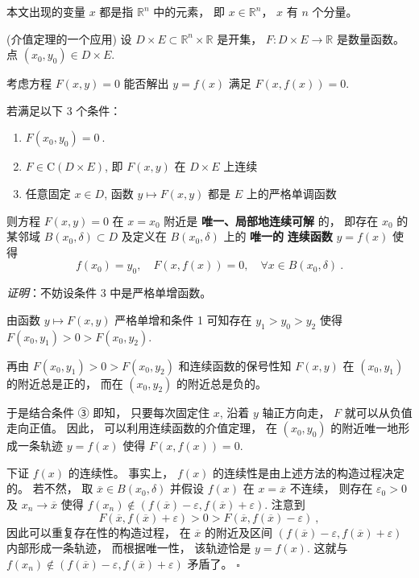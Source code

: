 

本文出现的变量 $x$ 都是指 $\mathbb{R}^n$ 中的元素， 即 $x\in\mathbb{R}^n$， $x$ 有 $n$ 个分量。

\begin{theorem}{(介值定理的一个应用)}\label{the_impli_1}
设 $D\times E\subset\mathbb{R}^{n}\times\mathbb{R}$ 是开集，
$F:D\times E\rightarrow\mathbb{R}$ 是数量函数。 点 $(x_{0},y_{0})\in D\times E.$ 

考虑方程 $F(x,y)=0$ 能否解出 $y=f(x)$ 满足 $F(x,f(x))=0.$ 

若满足以下 3 个条件：

\begin{enumerate}
\item $F(x_{0},y_{0})=0~.$
\item $F\in\mathrm{C}(D\times E)$, 即 $F(x,y)$ 在 $D\times E$ 上连续
\item 任意固定 $x\in D$, 函数 $y\mapsto F(x,y)$ 都是 $E$ 上的严格单调函数
\end{enumerate}

则方程 $F(x,y)=0$ 在 $x=x_{0}$ 附近是\textbf{ 唯一、局部地连续可解} 的， 即存在 $x_{0}$
的某邻域 $B(x_{0},\delta)\subset D$ 及定义在 $B(x_{0},\delta)$ 上的 \textbf{唯一的}\textbf{
连续函数} $y=f(x)$ 使得
$$
f(x_{0})=y_{0},\quad F(x,f(x))=0,\quad\forall x\in B(x_{0},\delta)~.
$$
\end{theorem}

\textsl{证明}：不妨设条件 3 中是严格单增函数。 

由函数 $y\mapsto F(x,y)$ 严格单增和条件 1 可知存在 $y_{1}>y_{0}>y_{2}$ 使得 $F(x_{0},y_{1})>0>F(x_{0},y_{2})$. 

再由 $F(x_{0},y_{1})>0>F(x_{0},y_{2})$ 和连续函数的保号性知 $F(x,y)$ 在 $(x_{0},y_{1})$
的附近总是正的， 而在 $(x_{0},y_{2})$ 的附近总是负的。 

于是结合条件 ③ 即知， 只要每次固定住 $x$, 沿着 $y$ 轴正方向走， $F$ 就可以从负值走向正值。 因此， 可以利用连续函数的介值定理，
在 $(x_{0},y_{0})$ 的附近唯一地形成一条轨迹 $y=f(x)$ 使得 $F(x,f(x))=0$. 

下证 $f(x)$ 的连续性。 事实上， $f(x)$ 的连续性是由上述方法的构造过程决定的。 若不然， 取 $\overline{x}\in B(x_0,\delta)$ 并假设 $f(x)$ 在
$x=\overline{x}$ 不连续， 则存在 $\varepsilon_{0}>0$ 及 $x_{n}\rightarrow\overline{x}$
使得 $f(x_{n})\notin(f(\overline{x})-\varepsilon,f(\overline{x})+\varepsilon)$.
注意到
$$
F(\overline{x},f(\overline{x})+\varepsilon)>0>F(\overline{x},f(\overline{x})-\varepsilon)~,
$$
因此可以重复存在性的构造过程， 在 \textbf{$\overline{x}$ }的附近及区间 $(f(\overline{x})-\varepsilon,f(\overline{x})+\varepsilon)$
内部形成一条轨迹， 而根据唯一性， 该轨迹恰是 $y=f(x)$. 这就与 $f(x_{n})\notin(f(\overline{x})-\varepsilon,f(\overline{x})+\varepsilon)$
矛盾了。 $\square$ 

